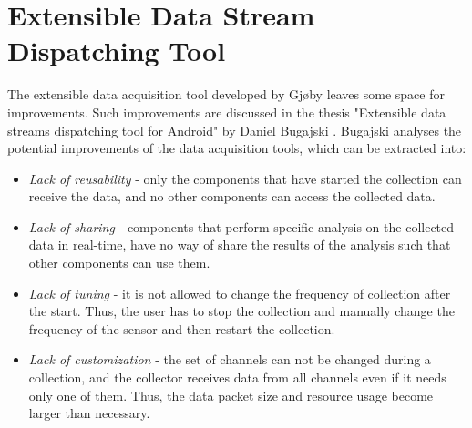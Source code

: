\section{Extensible Data Stream Dispatching Tool}
The extensible data acquisition tool developed by Gjøby leaves some space for improvements. Such improvements are discussed in the thesis "Extensible data streams dispatching tool for Android" by Daniel Bugajski \cite{daniel}. Bugajski analyses the potential improvements of the data acquisition tools, which can be extracted into:
\begin{itemize}
    \item \textit{Lack of reusability} - only the components that have started the collection can receive the data, and no other components can access the collected data.
    \item \textit{Lack of sharing} - components that perform specific analysis on the collected data in real-time, have no way of share the results of the analysis such that other components can use them. 
    \item \textit{Lack of tuning} - it is not allowed to change the frequency of collection after the start. Thus, the user has to stop the collection and manually change the frequency of the sensor and then restart the collection. 
    \item \textit{Lack of customization} - the set of channels can not be changed during a collection, and the collector receives data from all channels even if it needs only one of them. Thus, the data packet size and resource usage become larger than necessary.
\end{itemize}

